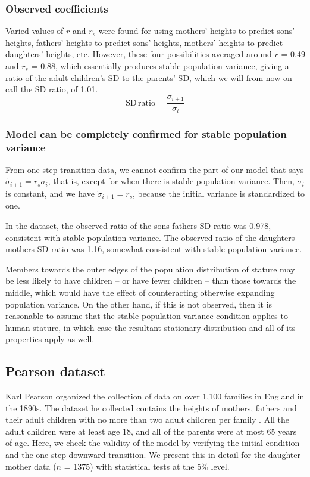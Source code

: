 \documentclass[a4paper,11pt]{article} %
\begin{document}
\subsubsection*{Observed coefficients}
Varied values of $r$ and $r_s$ were found for using mothers' heights to predict sons' heights, fathers' heights to predict sons' heights, mothers' heights to predict daughters' heights, etc. However, these four possibilities averaged around $r$ = 0.49 and $r_s$ = 0.88, which essentially produces stable population variance, giving a ratio of the adult children's SD to the parents' SD, which we will from now on call the SD ratio, of 1.01.
$$\mathrm{SD} \, \mathrm{ratio} = \frac{\sigma_{i+1}}{\sigma_i}$$

\subsubsection*{Model can be completely confirmed for stable population variance}
From one-step transition data, we cannot confirm the part of our model that says $\tilde{\sigma}_{i+1} = r_s \sigma_i$, that is, except for when there is stable population variance. Then, $\sigma_i$ is constant, and we have $\tilde{\sigma}_{i+1} = r_s$, because the initial variance is standardized to one.

In the dataset, the observed ratio of the sons-fathers SD ratio was 0.978, consistent with stable population variance. The observed ratio of the daughters-mothers SD ratio was 1.16, somewhat consistent with stable population variance. 

Members towards the outer edges of the population distribution of stature may be less likely to have children -- or have fewer children -- than those towards the middle, which would have the effect of counteracting otherwise expanding population variance. On the other hand, if this is not observed, then it is reasonable to assume that the stable population variance condition applies to human stature, in which case the resultant stationary distribution and all of its properties apply as well. 



\subsection{Pearson dataset}

Karl Pearson organized the collection of data on over 1,100 families in England in the 1890s. The dataset he collected contains the heights of mothers, fathers and their adult children with no more than two adult children per family \cite{pearson}. All the adult children were at least age 18, and all of the parents were at most 65 years of age. Here, we check the validity of the model by verifying the initial condition and the one-step downward transition. We present this in detail for the daughter-mother data ($n$ = 1375) with statistical tests at the 5\% level.
\end{document}
